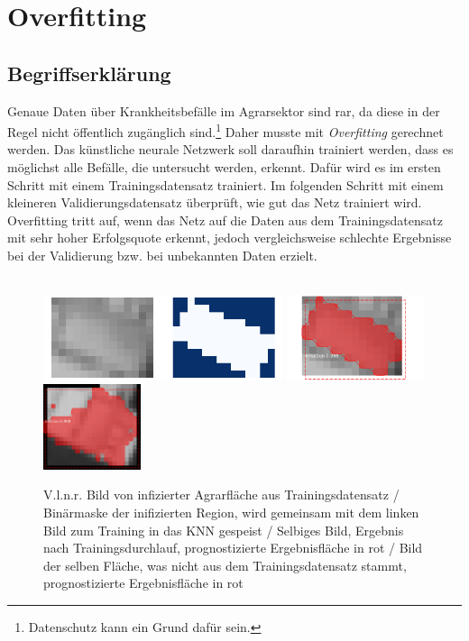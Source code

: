 \chapter{Overfitting}\label{chap:overfitting}

\section{Begriffserklärung}\label{sec:what-is-overfitting}

Genaue Daten über Krankheitsbefälle im Agrarsektor sind rar, da diese in der Regel nicht öffentlich zugänglich sind.\footnote{Datenschutz kann ein Grund dafür sein.}  Daher musste mit \textit{Overfitting} gerechnet werden. Das künstliche neurale Netzwerk soll daraufhin trainiert werden, dass es möglichst alle Befälle, die untersucht werden, erkennt. Dafür wird es im ersten Schritt mit einem Trainingsdatensatz trainiert. Im folgenden Schritt mit einem kleineren Validierungsdatensatz überprüft, wie gut das Netz trainiert wird. Overfitting tritt auf, wenn das Netz auf die Daten aus dem Trainingsdatensatz mit sehr hoher Erfolgsquote erkennt, jedoch vergleichsweise schlechte Ergebnisse bei der Validierung bzw. bei unbekannten Daten erzielt. 
\\\\
\begin{figure}[ht]
  \centering
  \includegraphics[height=2.5cm]{pics/mask.png}
  \includegraphics[height=2.5cm]{pics/pred.png}
  \includegraphics[height=2.5cm]{pics/bad-pred.png}
  \caption[Beispiel Overfitting]{V.l.n.r. Bild von infizierter Agrarfläche aus Trainingsdatensatz / Binärmaske der inifizierten Region, wird gemeinsam mit dem linken Bild zum Training in das KNN gespeist / Selbiges Bild, Ergebnis nach Trainingsdurchlauf, prognostizierte Ergebnisfläche in rot / Bild der selben Fläche, was nicht aus dem Trainingsdatensatz stammt, prognostizierte Ergebnisfläche in rot}
  \label{fig:example-overfitting}
\end{figure}
